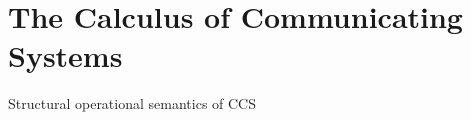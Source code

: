 \documentclass[smallcondensed]{svjour3}
\begin{document}
\section{The Calculus of Communicating Systems}\label{sec:CCS}


\begin{table}[t]
\normalsize
\begin{center}
\end{center}
\caption{Structural operational semantics of CCS}
\label{tab:CCS}
\end{table}
\end{document}
